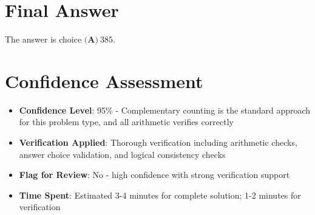 \documentclass[]{article}
\begin{document}
\section*{Final Answer}

The answer is choice $\textbf{(A)}\ 385$.

\section*{Confidence Assessment}
\begin{itemize}[leftmargin=*]
    \item \textbf{Confidence Level}: 95\% - Complementary counting is the standard approach for this problem type, and all arithmetic verifies correctly
    \item \textbf{Verification Applied}: Thorough verification including arithmetic checks, answer choice validation, and logical consistency checks
    \item \textbf{Flag for Review}: No - high confidence with strong verification support
    \item \textbf{Time Spent}: Estimated 3-4 minutes for complete solution; 1-2 minutes for verification
\end{itemize}
\end{document}
